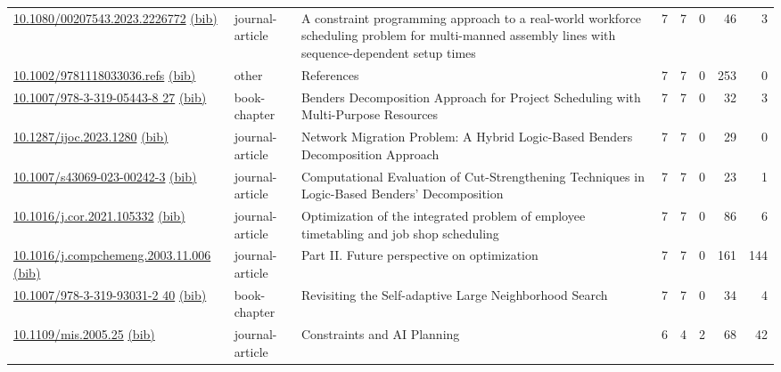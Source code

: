 {\begin{longtable}{p{5cm}lp{11cm}rrrrr}
\href{http://dx.doi.org/10.1080/00207543.2023.2226772}{10.1080/00207543.2023.2226772} \href{https://www.doi2bib.org/bib/10.1080/00207543.2023.2226772}{(bib)} & journal-article & A constraint programming approach to a real-world workforce scheduling problem for multi-manned assembly lines with sequence-dependent setup times & 7 & 7 & 0 & 46 & 3 \\
\href{http://dx.doi.org/10.1002/9781118033036.refs}{10.1002/9781118033036.refs} \href{https://www.doi2bib.org/bib/10.1002/9781118033036.refs}{(bib)} & other & References & 7 & 7 & 0 & 253 & 0 \\
\href{http://dx.doi.org/10.1007/978-3-319-05443-8_27}{10.1007/978-3-319-05443-8 27} \href{https://www.doi2bib.org/bib/10.1007/978-3-319-05443-8_27}{(bib)} & book-chapter & Benders Decomposition Approach for Project Scheduling with Multi-Purpose Resources & 7 & 7 & 0 & 32 & 3 \\
\href{http://dx.doi.org/10.1287/ijoc.2023.1280}{10.1287/ijoc.2023.1280} \href{https://www.doi2bib.org/bib/10.1287/ijoc.2023.1280}{(bib)} & journal-article & Network Migration Problem: A Hybrid Logic-Based Benders Decomposition Approach & 7 & 7 & 0 & 29 & 0 \\
\href{http://dx.doi.org/10.1007/s43069-023-00242-3}{10.1007/s43069-023-00242-3} \href{https://www.doi2bib.org/bib/10.1007/s43069-023-00242-3}{(bib)} & journal-article & Computational Evaluation of Cut-Strengthening Techniques in Logic-Based Benders' Decomposition & 7 & 7 & 0 & 23 & 1 \\
\href{http://dx.doi.org/10.1016/j.cor.2021.105332}{10.1016/j.cor.2021.105332} \href{https://www.doi2bib.org/bib/10.1016/j.cor.2021.105332}{(bib)} & journal-article & Optimization of the integrated problem of employee timetabling and job shop scheduling & 7 & 7 & 0 & 86 & 6 \\
\href{http://dx.doi.org/10.1016/j.compchemeng.2003.11.006}{10.1016/j.compchemeng.2003.11.006} \href{https://www.doi2bib.org/bib/10.1016/j.compchemeng.2003.11.006}{(bib)} & journal-article & Part II. Future perspective on optimization & 7 & 7 & 0 & 161 & 144 \\
\href{http://dx.doi.org/10.1007/978-3-319-93031-2_40}{10.1007/978-3-319-93031-2 40} \href{https://www.doi2bib.org/bib/10.1007/978-3-319-93031-2_40}{(bib)} & book-chapter & Revisiting the Self-adaptive Large Neighborhood Search & 7 & 7 & 0 & 34 & 4 \\
\href{http://dx.doi.org/10.1109/mis.2005.25}{10.1109/mis.2005.25} \href{https://www.doi2bib.org/bib/10.1109/mis.2005.25}{(bib)} & journal-article & Constraints and AI Planning & 6 & 4 & 2 & 68 & 42 \\

\end{longtable}}
